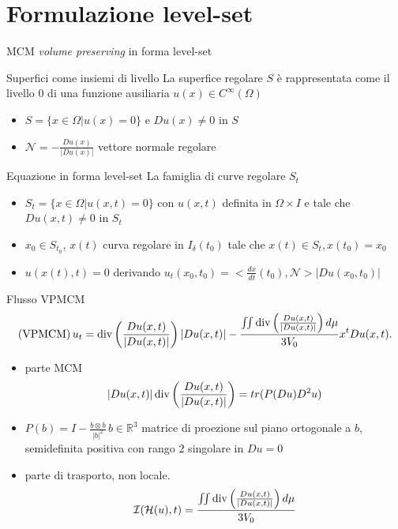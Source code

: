 \section{Formulazione level-set}
\begin{frame}{MCM \emph{volume preserving} in forma level-set}
  \begin{block}{Superfici come insiemi di livello}
    La superfice regolare $S$ è rappresentata come il livello $0$ di
    una funzione ausiliaria $u(x)\in C^{\infty}(\Omega)$
    \begin{itemize}
      \item $S=\{x\in\Omega | u(x)=0\}$ e $Du(x)\neq 0$ in $S$
      \item $\mathcal{N}=-\frac{Du(x)}{|Du(x)|}$ vettore normale
        regolare
    \end{itemize}
  \end{block}
  \begin{block}{Equazione in forma level-set}
    La famiglia di curve regolare $S_t$
    \begin{itemize}
      \item $S_t=\{x\in\Omega | u(x,t)=0\}$ con $u(x,t)$ definita in
        $\Omega\times I$ e tale che $Du(x,t)\neq 0$ in $S_t$
      \item $x_0\in S_{t_0}$, $x(t)$ curva regolare in
        $I_{\delta}(t_0)$ tale che $x(t)\in S_t,x(t_0)=x_0$
      \item $u(x(t),t)=0$ derivando $u_t(x_0,t_0)=<\frac{dx}{dt}(t_0),\mathcal{N}>|Du(x_0,t_0)|$
    \end{itemize}
  \end{block}
\end{frame}

\begin{frame}{Flusso VPMCM}
    \[
      (\text{VPMCM})\,u_t=\operatorname{div}\left(\frac{Du(x,t)}{|Du(x,t)|}\right)|Du(x,t)|-\frac{\iint\operatorname{div}\left(\frac{Du(x,t)}{|Du(x,t)|}\right)d\mu}{3V_0}x^tDu(x,t). 
      \]
    \begin{itemize}
    \item parte MCM 
      \[
      |Du(x,t)|\operatorname{div}\left(\frac{Du(x,t)}{|Du(x,t)|}\right)=tr(P(Du)D^2u)
      \]
      \item $P(b)=I-\frac{b\otimes b}{|b|^2}\,b\in\mathbb{R}^3$
        matrice di proezione sul piano ortogonale a $b$, semidefinita
        positiva con rango $2$ singolare in $Du=0$
      \item parte di trasporto, non locale. 
        \[
        \mathcal{I}(\mathcal{H}(u),t)=\frac{\iint\operatorname{div}\left(\frac{Du(x,t)}{|Du(x,t)|}\right)d\mu}{3V_0}
        \]
     \end{itemize}
\end{frame}

